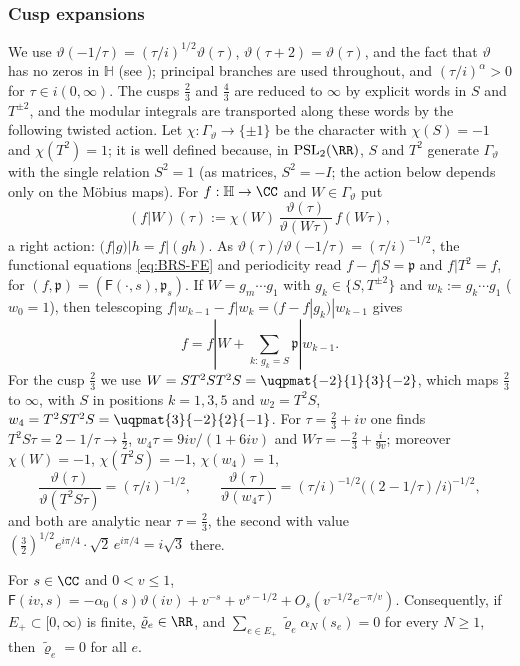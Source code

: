 \subsubsection{Cusp expansions}\label{app:cusp}
We use $\vartheta(-1/\tau)=(\tau/i)^{1/2}\vartheta(\tau)$, $\vartheta(\tau+2)=\vartheta(\tau)$, and the fact that $\vartheta$ has no zeros in $\mathbb H$
(see \cite[\S3.2]{BRS}); principal branches are used throughout, and $(\tau/i)^\alpha>0$ for $\tau\in i(0,\infty)$. The cusps $\frac23$ and $\frac43$
are reduced to $\infty$ by explicit words in $S$ and $T^{\pm2}$, and the modular integrals are transported along these words by the
following twisted action.
Let $\chi:\Gamma_\vartheta\to\{\pm1\}$ be the character with $\chi(S)=-1$ and $\chi(T^2)=1$; it is well defined because, in
$\mathrm{PSL}_2(\RR)$, $S$ and $T^2$ generate $\Gamma_\vartheta$ with the single relation $S^2=1$ \cite[\S3.1]{BRS} (as matrices, $S^2=-I$; the
action below depends only on the M\"obius maps). For $f:\mathbb H\to\CC$ and $W\in\Gamma_\vartheta$ put
\[
(f|W)(\tau):=\chi(W)\,\frac{\vartheta(\tau)}{\vartheta(W\tau)}\,f(W\tau),
\]
a right action: $(f|g)|h=f|(gh)$. As $\vartheta(\tau)/\vartheta(-1/\tau)=(\tau/i)^{-1/2}$, the functional equations
\eqref{eq:BRS-FE} and periodicity read $f-f|S=\mathfrak p$ and $f|T^2=f$, for $(f,\mathfrak p)=(\mathsf F(\cdot,s),\mathfrak p_s)$. If $W=g_m\cdots g_1$ with $g_k\in\{S,T^{\pm2}\}$ and $w_k:=g_k\cdots g_1$ ($w_0=1$), then telescoping
$f|w_{k-1}-f|w_k=(f-f|g_k)|w_{k-1}$ gives
\begin{equation}\label{eq:unroll}
f=f|W+\sum_{k:\,g_k=S}\mathfrak p|w_{k-1}.
\end{equation}
For the cusp $\frac23$ we use $W=ST^2ST^2S=\uqpmat{-2}{1}{3}{-2}$, which maps $\frac23$ to $\infty$, with $S$ in positions $k=1,3,5$ and
$w_2=T^2S$, $w_4=T^2ST^2S=\uqpmat{3}{-2}{2}{-1}$. For $\tau=\frac23+iv$ one finds $T^2S\tau=2-1/\tau\to\frac12$, $w_4\tau=9iv/(1+6iv)$ and
$W\tau=-\frac23+\frac i{9v}$; moreover $\chi(W)=-1$, $\chi(T^2S)=-1$, $\chi(w_4)=1$,
\begin{equation}\label{eq:jfactors}
\frac{\vartheta(\tau)}{\vartheta(T^2S\tau)}=(\tau/i)^{-1/2},\qquad
\frac{\vartheta(\tau)}{\vartheta(w_4\tau)}=(\tau/i)^{-1/2}\big((2-1/\tau)/i\big)^{-1/2},
\end{equation}
and both are analytic near $\tau=\frac23$, the second with value $(\frac32)^{1/2}e^{i\pi/4}\cdot\sqrt2\,e^{i\pi/4}=i\sqrt3$ there.

\begin{lemma}\label{lem:cusp0}
For $s\in\CC$ and $0<v\le1$, $\mathsf F(iv,s)=-\alpha_0(s)\vartheta(iv)+v^{-s}+v^{s-1/2}+O_s(v^{-1/2}e^{-\pi/v})$. Consequently, if $E_+\subset[0,\infty)$
is finite, $\tilde\varrho_e\in\RR$, and $\sum_{e\in E_+}\tilde\varrho_e\alpha_N(s_e)=0$ for every $N\ge1$, then $\tilde\varrho_e=0$ for all $e$.
\end{lemma}

